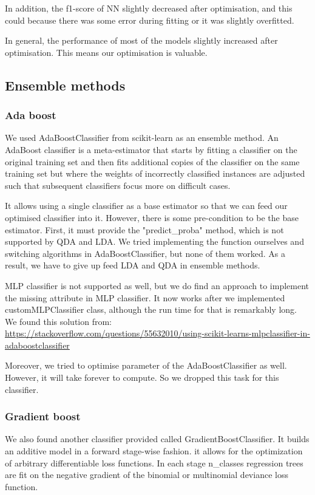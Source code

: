 \documentclass{article}
\begin{document}
In addition, the f1-score of NN slightly decreased  after optimisation, and this could because there was some error during fitting or it was slightly overfitted. 

In general, the performance of most of the models slightly increased after optimisation. This means our optimisation is valuable. 

\subsection{Ensemble methods}
\subsubsection{Ada boost}
We used AdaBoostClassifier from scikit-learn as an ensemble method. An AdaBoost classifier is a meta-estimator that starts by fitting a classifier on the original training set and then fits additional copies of the classifier on the same training set but where the weights of incorrectly classified instances are adjusted such that subsequent classifiers focus more on difficult cases.\cite{5}

It allows using a single classifier as a base estimator so that we can feed our optimised classifier into it. However, there is some pre-condition to be the base estimator. First, it must provide the "predict\_proba" method, which is not supported by QDA and LDA. We tried implementing the function ourselves and switching algorithms in AdaBoostClassifier, but none of them worked. As a result, we have to give up feed LDA and QDA in ensemble methods. 

MLP classifier is not supported as well, but we do find an approach to implement the missing attribute in MLP classifier. It now works after we implemented customMLPClassifier class, although the run time for that is remarkably long. We found this solution from: \url{https://stackoverflow.com/questions/55632010/using-scikit-learns-mlpclassifier-in-adaboostclassifier}

Moreover, we tried to optimise parameter of the AdaBoostClassifier as well. However, it will take forever to compute. So we dropped this task for this classifier.

\subsubsection{Gradient boost}
We also found another classifier provided called GradientBoostClassifier. It builds an additive model in a forward stage-wise fashion. it allows for the optimization of arbitrary differentiable loss functions. In each stage n\_classes regression trees are fit on the negative gradient of the binomial or multinomial deviance loss function. \cite{5}
\end{document}
